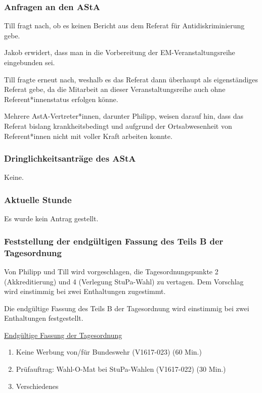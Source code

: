 \documentclass[ngerman,headheight=70pt]{scrartcl}
\begin{document}
    \subsubsection{Anfragen an den AStA}

    Till fragt nach, ob es keinen Bericht aus dem Referat für Antidiskriminierung gebe.

    Jakob erwidert, dass man in die Vorbereitung der EM-Veranstaltungsreihe
    eingebunden sei.

    Till fragte erneut nach, weshalb es das Referat dann überhaupt als eigenständiges
    Referat gebe, da die Mitarbeit an dieser Veranstaltungsreihe auch ohne
    Referent*innenstatus erfolgen könne.

    Mehrere AstA-Vertreter*innen, darunter Philipp, weisen darauf hin, dass das Referat
    bislang krankheitsbedingt und aufgrund der Ortsabwesenheit von Referent*innen
    nicht mit voller Kraft arbeiten konnte.

    \subsubsection{Dringlichkeitsanträge des AStA}

    Keine.

    \subsubsection{Aktuelle Stunde}

    Es wurde kein Antrag gestellt.

    \subsubsection{Feststellung der endgültigen Fassung des Teils B der Tagesordnung}

    Von Philipp und Till wird vorgeschlagen, die Tagesordnungspunkte 2 (Akkreditierung)
    und 4 (Verlegung StuPa-Wahl) zu vertagen. Dem Vorschlag wird einstimmig bei
    zwei Enthaltungen zugestimmt.

    Die endgültige Fassung des Teils B der Tagesordnung wird einstimmig bei zwei
    Enthaltungen festgestellt.

    \underline{Endgültige Fassung der Tagesordnung}
    \begin{enumerate}[label={\textbf{Top \theenumi}},leftmargin=*]
        \item Keine Werbung von/für Bundeswehr (V1617-023) (60 Min.)
        \item Prüfauftrag: Wahl-O-Mat bei StuPa-Wahlen (V1617-022) (30 Min.)
        \item Verschiedenes
    \end{enumerate}
\end{document}
